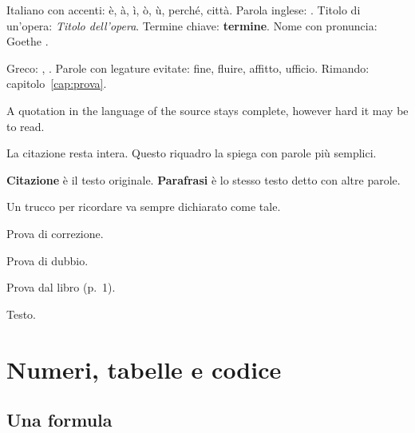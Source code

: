 Italiano con accenti: è, à, ì, ò, ù, perché, città. Parola inglese: . Titolo di un'opera: \emph{Titolo dell'opera}. Termine chiave: \textbf{termine}. Nome con pronuncia: Goethe .

Greco: , . Parole con legature evitate: fine, fluire, affitto, ufficio. Rimando: capitolo~\ref{cap:prova}.

\begin{cit}[english]
A quotation in the language of the source stays complete, however hard it may be to read.
\end{cit}

\begin{parolesemplici}
La citazione resta intera. Questo riquadro la spiega con parole più semplici.
\end{parolesemplici}


\begin{nonconfondere}
\textbf{Citazione} è il testo originale. \textbf{Parafrasi} è lo stesso testo detto con altre parole.
\end{nonconfondere}

\begin{permemoria}
Un trucco per ricordare va sempre dichiarato come tale.
\end{permemoria}

\begin{correzione}Prova di correzione.\end{correzione}
\begin{dubbio}Prova di dubbio.\end{dubbio}
\begin{dallibro}Prova dal libro (p.~1).\end{dallibro}
\soloappunti
Testo. 

\section{Numeri, tabelle e codice}\label{sec:prova-dati}

\subsection{Una formula}

